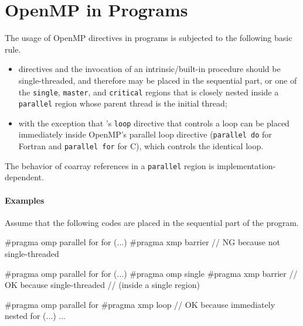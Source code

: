 \chapter{OpenMP in {\XMP} Programs}
\label{chap:openmp}

The usage of OpenMP directives in {\XMP} programs is subjected to
the following basic rule.

\begin{itemize}
 \item {\XMP} directives and the invocation of an {\XMP}
       intrinsic/built-in procedure should be single-threaded, and
       therefore may be placed in the sequential part, or one of
       the {\tt single}, {\tt master}, and {\tt critical} regions
       that is closely nested inside a {\tt parallel} region whose
       parent thread is the initial thread;

 \item with the exception that {\XMP}'s {\tt loop} directive that
       controls a loop can be placed immediately inside OpenMP's
       parallel loop directive ({\tt parallel do} for Fortran and
       {\tt parallel for} for C), which controls the identical loop.
\end{itemize}

The behavior of coarray references in a {\tt parallel} region is
implementation-dependent.

\subsubsection*{Examples}

Assume that the following codes are placed in the sequential part of
the program.

\begin{XCexample}
#pragma omp parallel for 
for (...){
  #pragma xmp barrier  // NG because not single-threaded
}
\end{XCexample}

\begin{XCexample}
#pragma omp parallel for 
for (...){
  #pragma omp single 
  {
    #pragma xmp barrier  // OK because single-threaded
                         // (inside a single region)
  }
}
\end{XCexample}

\begin{XCexample}
#pragma omp parallel for
#pragma xmp loop  // OK because immediately nested
for (...){
  ...
}
\end{XCexample}

